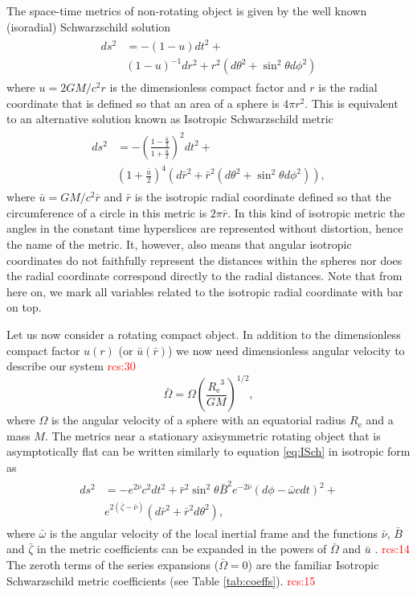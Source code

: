 \documentclass[iop, usenatbib]{emulateapj}
\newcommand{\be}{\begin{equation}}
\newcommand{\ee}{\end{equation}}
\newcommand{\red}[1]{\textcolor{red}{#1}}
\newcommand{\Req}{\ensuremath{R_{\mathrm{e}}}}
\newcommand{\sch}{Schwarzschild }
\newcommand{\rb}{\ensuremath{\bar{r}}}
\renewcommand{\ub}{\ensuremath{\bar{u}}}
\newcommand{\wb}{\ensuremath{\bar{\omega}}}
\newcommand{\Ob}{\ensuremath{\bar{\Omega}}}
\newcommand{\nub}{\ensuremath{\bar{\nu}}}
\newcommand{\zetab}{\ensuremath{\bar{\zeta}}}
\newcommand{\Bb}{\ensuremath{\bar{B}}}
\begin{document}
The space-time metrics of non-rotating object is given by the well known (isoradial) \sch solution
\begin{align}\begin{split}
ds^2 & = -(1-u)dt^2 + \\
     & (1-u)^{-1}dr^2+r^2(d\theta^2+\sin^2\theta d\phi^2)
\end{split}\end{align}
where $u = 2GM/c^2 r$ is the dimensionless compact factor and $r$ is the radial coordinate that is defined so that an area of a sphere is $4\pi r^2$.
This is equivalent to an alternative solution known as Isotropic \sch metric \citep[see for e.g.][]{MTW73}
\begin{align}\begin{split}
\label{eq:ISch}
ds^2 & = -\left( \frac{1-\frac{\ub}{2}}{1+\frac{\ub}{2}} \right)^2 dt^2 + \\
     & (1+\frac{\ub}{2})^4(d\rb^2 + \rb^2(d\theta^2+\sin^2\theta d\phi^2)),
\end{split}\end{align}
where $\ub=GM/c^2\rb$ and $\rb$ is the isotropic radial coordinate defined so that the circumference of a circle in this metric is $2\pi\rb$.
In this kind of isotropic metric the angles in the constant time hyperslices are represented without distortion, hence the name of the metric.
It, however, also means that angular isotropic coordinates do not faithfully represent the distances within the spheres nor does the radial coordinate correspond directly to the radial distances.
Note that from here on, we mark all variables related to the isotropic radial coordinate with bar on top.

Let us now consider a rotating compact object.
In addition to the dimensionless compact factor $u(r)$ (or $\ub(\rb)$) we now need dimensionless angular velocity to describe our system \red{rcs:30}
\be
\Ob = \Omega \left( \frac{\Req^3}{G M} \right)^{1/2},
\ee
where $\Omega$ is the angular velocity of a sphere with an equatorial radius $\Req$ and a mass $M$.
The metrics near a stationary axisymmetric rotating object that is asymptotically flat can be written similarly to equation \eqref{eq:ISch} in isotropic form as \citep{BW71} 
\begin{align}\begin{split} \label{eq:BWmetric}
ds^2 & = -e^{2\nub}c^2dt^2 +
     \rb^2 \sin^2\theta \Bb^2 e^{-2\nub}(d\phi - \wb cdt)^2 + \\
     & e^{2(\zetab-\nub)}(d\rb^2 + \rb^2d\theta^2),
\end{split}\end{align}
where $\wb$ is the angular velocity of the local inertial frame and the functions $\nub$, $\Bb$ and $\zetab$ in the metric coefficients can be expanded in the powers of $\Ob$ and $\ub$ \citep{BI76}.
\red{rcs:14}
The zeroth terms of the series expansions ($\Ob = 0$) are the familiar Isotropic \sch metric coefficients (see Table \ref{tab:coeffs}).
\red{rcs:15}
\end{document}
